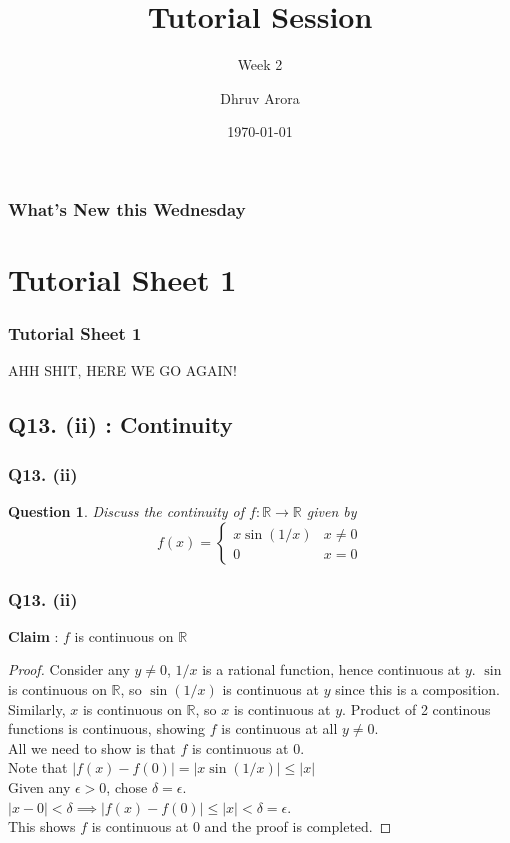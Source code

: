 \documentclass[handout,aspectratio=169]{beamer}
\title{Tutorial Session}
\subtitle{Week 2}
\author{Dhruv Arora}
\institute{Sphomore, Dept of CSE}
\date{\today}
\newtheorem{qsn}{Question}
\newcommand{\bR}{\mathbb{R}}
\begin{document}
\begin{frame}[plain]
\titlepage
\end{frame}

\begin{frame}[plain]
\frametitle{What's New this Wednesday}
\tableofcontents
\end{frame}

\section{Tutorial Sheet 1}

\begin{frame}
\frametitle{Tutorial Sheet 1}
\pause
AHH SHIT, HERE WE GO AGAIN!
\end{frame}

\subsection{Q13. (ii) : Continuity}

\begin{frame}
\frametitle{Q13. (ii)}
\pause
\begin{qsn}
Discuss the continuity of $f : \bR \to \bR$ given by
$$f(x) = 
\begin{cases}
x \sin (1/x) & x\neq 0\\
0 & x=0
\end{cases}$$
\end{qsn}
\end{frame}

\begin{frame}
\frametitle{Q13. (ii)}
\textbf{Claim} : $f$ is continuous on $\bR$
\pause
\begin{proof}
Consider any $y\neq 0$, $1/x$ is a rational function, hence continuous at $y$. $\sin$ is continuous on $\bR$, so $\sin(1/x)$ is continuous at $y$ since this is a composition. Similarly, $x$ is continuous on $\bR$, so $x$ is continuous at $y$. Product of 2 continous functions is continuous, showing $f$ is continuous at all $y\neq 0$.\\[1mm] \pause
All we need to show is that $f$ is continuous at $0$.\\ \pause
Note that $|f(x)-f(0)| = |x\sin(1/x)| \leq |x|$\\ \pause
Given any $\epsilon>0$, chose $\delta = \epsilon$.\\ \pause
$|x-0|<\delta \implies |f(x)-f(0)| \leq |x| < \delta = \epsilon$.\\
This shows $f$ is continuous at 0 and the proof is completed.
\end{proof}
\end{frame}
\end{document}
